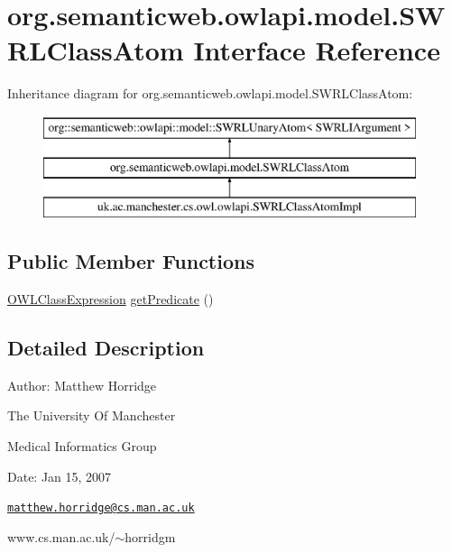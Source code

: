 \hypertarget{interfaceorg_1_1semanticweb_1_1owlapi_1_1model_1_1_s_w_r_l_class_atom}{\section{org.\-semanticweb.\-owlapi.\-model.\-S\-W\-R\-L\-Class\-Atom Interface Reference}
\label{interfaceorg_1_1semanticweb_1_1owlapi_1_1model_1_1_s_w_r_l_class_atom}
}
Inheritance diagram for org.\-semanticweb.\-owlapi.\-model.\-S\-W\-R\-L\-Class\-Atom\-:\begin{figure}[H]
\begin{center}
\leavevmode
\includegraphics[height=3.000000cm]{interfaceorg_1_1semanticweb_1_1owlapi_1_1model_1_1_s_w_r_l_class_atom}
\end{center}
\end{figure}
\subsection*{Public Member Functions}
\begin{DoxyCompactItemize}
\item 
\hyperlink{interfaceorg_1_1semanticweb_1_1owlapi_1_1model_1_1_o_w_l_class_expression}{O\-W\-L\-Class\-Expression} \hyperlink{interfaceorg_1_1semanticweb_1_1owlapi_1_1model_1_1_s_w_r_l_class_atom_a2da06a61bc7a03f24c31a6b985d73b45}{get\-Predicate} ()
\end{DoxyCompactItemize}


\subsection{Detailed Description}
Author\-: Matthew Horridge\par
 The University Of Manchester\par
 Medical Informatics Group\par
 Date\-: Jan 15, 2007\par
\par
 

\href{mailto:matthew.horridge@cs.man.ac.uk}{\tt matthew.\-horridge@cs.\-man.\-ac.\-uk}\par
 www.\-cs.\-man.\-ac.\-uk/$\sim$horridgm\par
\par
 

